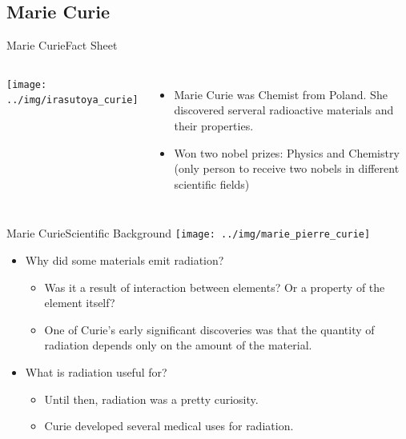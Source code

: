 \subsection{Marie Curie}
\begin{frame}{Marie Curie}{Fact Sheet}
  \begin{columns}
  \texttt{[image: ../img/irasutoya\_curie]}
  \\

    \begin{itemize}
      \item Marie Curie was Chemist from Poland. She discovered serveral radioactive materials and their properties.
      \medskip
      
      \item Won two nobel prizes: Physics and Chemistry\\
      (only person to receive two nobels in different scientific fields)
    \end{itemize}
  \end{columns}
\end{frame}

\begin{frame}{Marie Curie}{Scientific Background}
  \hfill\texttt{[image: ../img/marie\_pierre\_curie]}
  \begin{itemize}
    \item Why did some materials emit radiation?
    \begin{itemize}
      \item Was it a result of interaction between elements? Or a property of the element itself?
      \item One of Curie's early significant discoveries was that the quantity of radiation depends only on the amount of the material.
    \end{itemize}
    \item What is radiation useful for?
    \begin{itemize}
      \item Until then, radiation was a pretty curiosity.
      \item Curie developed several medical uses for radiation.
    \end{itemize}
  \end{itemize}
\end{frame}

